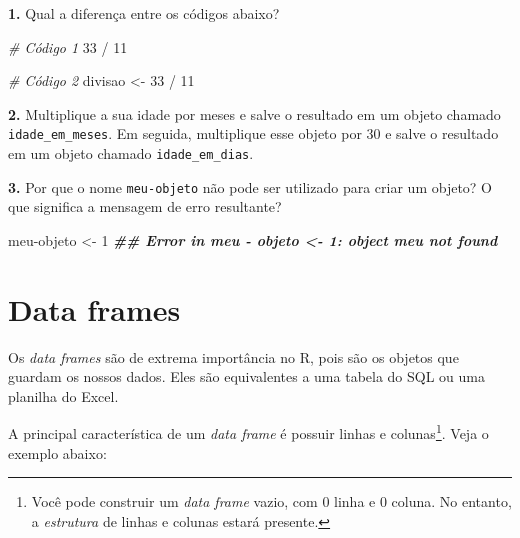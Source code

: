 \documentclass[
]{book}
\newenvironment{Shaded}{\begin{snugshade}}{\end{snugshade}}
\newcommand{\CommentTok}[1]{\textcolor[rgb]{0.56,0.35,0.01}{\textit{#1}}}
\newcommand{\DecValTok}[1]{\textcolor[rgb]{0.00,0.00,0.81}{#1}}
\newcommand{\DocumentationTok}[1]{\textcolor[rgb]{0.56,0.35,0.01}{\textbf{\textit{#1}}}}
\newcommand{\NormalTok}[1]{#1}
\newcommand{\OtherTok}[1]{\textcolor[rgb]{0.56,0.35,0.01}{#1}}
\newcommand{\SpecialCharTok}[1]{\textcolor[rgb]{0.00,0.00,0.00}{#1}}
\begin{document}
\textbf{1.} Qual a diferença entre os códigos abaixo?

\begin{Shaded}
\begin{Highlighting}[]
\CommentTok{\# Código 1}
\DecValTok{33} \SpecialCharTok{/} \DecValTok{11}

\CommentTok{\# Código 2}
\NormalTok{divisao }\OtherTok{\textless{}{-}} \DecValTok{33} \SpecialCharTok{/} \DecValTok{11}
\end{Highlighting}
\end{Shaded}

\textbf{2.} Multiplique a sua idade por meses e salve o resultado em um objeto chamado \texttt{idade\_em\_meses}. Em seguida, multiplique esse objeto por 30 e salve o resultado em um objeto chamado \texttt{idade\_em\_dias}.

\textbf{3.} Por que o nome \texttt{meu-objeto} não pode ser utilizado para criar um objeto? O que significa a mensagem de erro resultante?

\begin{Shaded}
\begin{Highlighting}[]
\NormalTok{meu}\SpecialCharTok{{-}}\NormalTok{objeto }\OtherTok{\textless{}{-}} \DecValTok{1}
\DocumentationTok{\#\# Error in meu {-} objeto \textless{}{-} 1: object \textquotesingle{}meu\textquotesingle{} not found}
\end{Highlighting}
\end{Shaded}

\hypertarget{data-frames}{%
\section{Data frames}\label{data-frames}}

Os \emph{data frames} são de extrema importância no R, pois são os objetos que guardam os nossos dados. Eles são equivalentes a uma tabela do SQL ou uma planilha do Excel.

A principal característica de um \emph{data frame} é possuir linhas e colunas\footnote{Você pode construir um \emph{data frame} vazio, com 0 linha e 0 coluna. No entanto, a \emph{estrutura} de linhas e colunas estará presente.}. Veja o exemplo abaixo:
\end{document}
